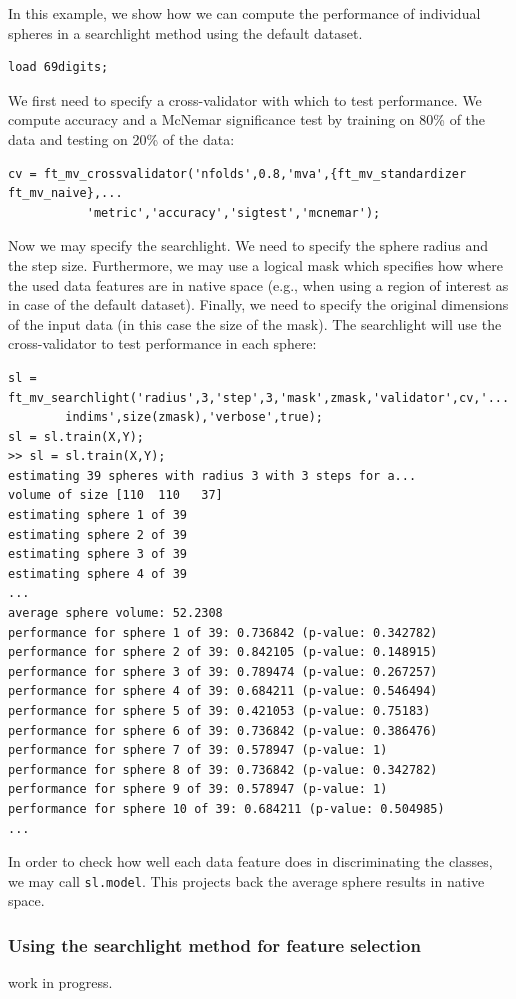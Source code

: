 \documentclass{article}
\renewcommand{\t}[1]{{\tt #1}}
\begin{document}
In this example, we show how we can compute the performance of individual spheres in a searchlight method using the default dataset. 
\begin{verbatim}
load 69digits;
\end{verbatim}
We first need to specify a cross-validator with which to test performance. We compute accuracy and a McNemar significance test by training on 80\% of the data and testing on 20\% of the data:
\begin{verbatim}
cv = ft_mv_crossvalidator('nfolds',0.8,'mva',{ft_mv_standardizer ft_mv_naive},...
           'metric','accuracy','sigtest','mcnemar');
\end{verbatim}
Now we may specify the searchlight. We need to specify the sphere radius and the step size. Furthermore, we may use a logical mask which specifies how where the used data features are in native space (e.g., when using a region of interest as in case of the default dataset). Finally, we need to specify the original dimensions of the input data (in this case the size of the mask). The searchlight will use the cross-validator to test performance in each sphere:
\begin{verbatim}
sl = ft_mv_searchlight('radius',3,'step',3,'mask',zmask,'validator',cv,'...
        indims',size(zmask),'verbose',true);
sl = sl.train(X,Y);
>> sl = sl.train(X,Y);
estimating 39 spheres with radius 3 with 3 steps for a...
volume of size [110  110   37]
estimating sphere 1 of 39
estimating sphere 2 of 39
estimating sphere 3 of 39
estimating sphere 4 of 39
...
average sphere volume: 52.2308
performance for sphere 1 of 39: 0.736842 (p-value: 0.342782)
performance for sphere 2 of 39: 0.842105 (p-value: 0.148915)
performance for sphere 3 of 39: 0.789474 (p-value: 0.267257)
performance for sphere 4 of 39: 0.684211 (p-value: 0.546494)
performance for sphere 5 of 39: 0.421053 (p-value: 0.75183)
performance for sphere 6 of 39: 0.736842 (p-value: 0.386476)
performance for sphere 7 of 39: 0.578947 (p-value: 1)
performance for sphere 8 of 39: 0.736842 (p-value: 0.342782)
performance for sphere 9 of 39: 0.578947 (p-value: 1)
performance for sphere 10 of 39: 0.684211 (p-value: 0.504985)
...
\end{verbatim}
In order to check how well each data feature  does in discriminating the classes, we may call \t{sl.model}. This projects back the average sphere results in native space.

\subsubsection*{Using the searchlight method for feature selection}

work in progress.





\def\refname{}

\end{document}
